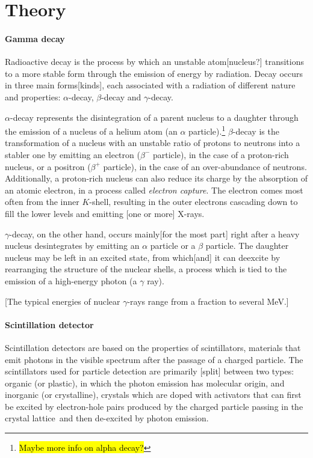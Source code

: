 \section{Theory}
\paragraph{Gamma decay}
Radioactive decay is the process by which an unstable atom[nucleus?] transitions to a more stable form through the emission of energy by radiation.
Decay occurs in three main forms[kinds], each associated with a radiation of different nature and properties: $\alpha$-decay, $\beta$-decay and $\gamma$-decay.

$\alpha$-decay represents the disintegration of a parent nucleus to a daughter through the emission of a nucleus of a helium atom (an $\alpha$ particle).\footnote{\hl{Maybe more info on alpha decay?}}
$\beta$-decay is the transformation of a nucleus with an unstable ratio of protons to neutrons into a stabler one by emitting an electron ($\beta^-$ particle), in the case of a proton-rich nucleus, or a positron ($\beta^+$ particle), in the case of an over-abundance of neutrons.
Additionally, a proton-rich nucleus can also reduce its charge by the absorption of an atomic electron, in a process called \emph{electron capture}.
The electron comes most often from the inner $K$-shell, resulting in the outer electrons cascading down to fill the lower levels and emitting [one or more] X-rays\cite{intro_nuclear_particle_physics}.

$\gamma$-decay, on the other hand, occurs mainly[for the most part] right after a heavy nucleus desintegrates by emitting an $\alpha$ particle or a $\beta$ particle.
The daughter nucleus may be left in an excited state, from which[and] it can deexcite by rearranging the structure of the nuclear shells, 
a process which is tied to the emission of a high-energy photon (a $\gamma$ ray).

[The typical energies of nuclear $\gamma$-rays range from a fraction to several MeV.]

\paragraph{Scintillation detector}
Scintillation detectors are based on the properties of scintillators, materials that emit photons in the visible spectrum after the passage of a charged particle.
The scintillators used for particle detection are primarily [split] between two types: organic (or plastic), in which the photon emission has molecular origin, 
and inorganic (or crystalline), crystals which are doped with activators that can first be excited by electron-hole pairs 
produced by the charged particle passing in the crystal lattice\footnotemark\ and then de-excited by photon emission\cite{intro_nuclear_particle_physics}.

